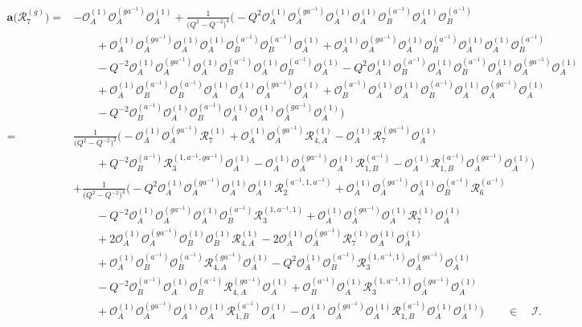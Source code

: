 \documentclass{amsart}
\newcommand{\Oa}{\mathcal O_A}
\newcommand{\Ob}{\mathcal O_B}
\newcommand{\R}{\mathcal R}
\begin{document}
\begin{align*}
\mathbf a\big(\R_7^{(g)}\big)=&-\Oa^{(1)}\Oa^{(ga^{-1})}\Oa^{(1)}+\frac1{\big(Q^2-Q^{-2}\big)^4}\Big(-Q^2\Oa^{(1)}\Oa^{(ga^{-1})}\Oa^{(1)}\Oa^{(1)}\Ob^{(a^{-1})}\Oa^{(1)}\Ob^{(a^{-1})}\\
&\qquad+\Oa^{(1)}\Oa^{(ga^{-1})}\Oa^{(1)}\Oa^{(1)}\Ob^{(a^{-1})}\Ob^{(a^{-1})}\Oa^{(1)}+\Oa^{(1)}\Oa^{(ga^{-1})}\Oa^{(1)}\Ob^{(a^{-1})}\Oa^{(1)}\Oa^{(1)}\Ob^{(a^{-1})}\\
&\qquad-Q^{-2}\Oa^{(1)}\Oa^{(ga^{-1})}\Oa^{(1)}\Ob^{(a^{-1})}\Oa^{(1)}\Ob^{(a^{-1})}\Oa^{(1)}-Q^2\Oa^{(1)}\Ob^{(a^{-1})}\Oa^{(1)}\Ob^{(a^{-1})}\Oa^{(1)}\Oa^{(ga^{-1})}\Oa^{(1)}\\
&\qquad+\Oa^{(1)}\Ob^{(a^{-1})}\Ob^{(a^{-1})}\Oa^{(1)}\Oa^{(1)}\Oa^{(ga^{-1})}\Oa^{(1)}+\Ob^{(a^{-1})}\Oa^{(1)}\Oa^{(1)}\Ob^{(a^{-1})}\Oa^{(1)}\Oa^{(ga^{-1})}\Oa^{(1)}\\
&\qquad-Q^{-2}\Ob^{(a^{-1})}\Oa^{(1)}\Ob^{(a^{-1})}\Oa^{(1)}\Oa^{(1)}\Oa^{(ga^{-1})}\Oa^{(1)}\Big)\\
=&\frac1{\big(Q^2-Q^{-2}\big)^2}\Big(-\Oa^{(1)}\Oa^{(ga^{-1})}\R_{7}^{(1)}+\Oa^{(1)}\Oa^{(ga^{-1})}\R_{4,A}^{(1)}-\Oa^{(1)}\R_{7}^{(ga^{-1})}\Oa^{(1)}\\
&\qquad+Q^{-2}\Ob^{(a^{-1})}\R_{3}^{(1,a^{-1},ga^{-1})}\Oa^{(1)}-\Oa^{(1)}\Oa^{(ga^{-1})}\Oa^{(1)}\R_{1,B}^{(a^{-1})}-\Oa^{(1)}\R_{1,B}^{(a^{-1})}\Oa^{(ga^{-1})}\Oa^{(1)}\Big)\\
&+\frac1{\big(Q^2-Q^{-2}\big)^4}\Big(-Q^2\Oa^{(1)}\Oa^{(ga^{-1})}\Oa^{(1)}\Oa^{(1)}\R_{2}^{(a^{-1},1,a^{-1})}+\Oa^{(1)}\Oa^{(ga^{-1})}\Oa^{(1)}\Ob^{(a^{-1})}\R_{6}^{(a^{-1})}\\
&\qquad-Q^{-2}\Oa^{(1)}\Oa^{(ga^{-1})}\Oa^{(1)}\Ob^{(a^{-1})}\R_{3}^{(1,a^{-1},1)}+\Oa^{(1)}\Oa^{(ga^{-1})}\Oa^{(1)}\R_{7}^{(1)}\Oa^{(1)}\\
&\qquad+2\Oa^{(1)}\Oa^{(ga^{-1})}\Ob^{(1)}\Ob^{(1)}\R_{4,A}^{(1)}-2\Oa^{(1)}\Oa^{(ga^{-1})}\R_{7}^{(1)}\Oa^{(1)}\Oa^{(1)}\\
&\qquad+\Oa^{(1)}\Ob^{(a^{-1})}\Ob^{(a^{-1})}\R_{4,A}^{(ga^{-1})}\Oa^{(1)}-Q^2\Oa^{(1)}\Ob^{(a^{-1})}\R_{3}^{(1,a^{-1},1)}\Oa^{(ga^{-1})}\Oa^{(1)}\\
&\qquad-Q^{-2}\Ob^{(a^{-1})}\Oa^{(1)}\Ob^{(a^{-1})}\R_{4,A}^{(ga^{-1})}\Oa^{(1)}+\Ob^{(a^{-1})}\Oa^{(1)}\R_{3}^{(1,a^{-1},1)}\Oa^{(ga^{-1})}\Oa^{(1)}\\
&\qquad+\Oa^{(1)}\Oa^{(ga^{-1})}\Oa^{(1)}\Oa^{(1)}\R_{1,B}^{(a^{-1})}\Oa^{(1)}-\Oa^{(1)}\Oa^{(ga^{-1})}\Oa^{(1)}\R_{1,B}^{(a^{-1})}\Oa^{(1)}\Oa^{(1)}\Big)\qquad\in\quad\mathcal I.
\end{align*}
\end{document}
